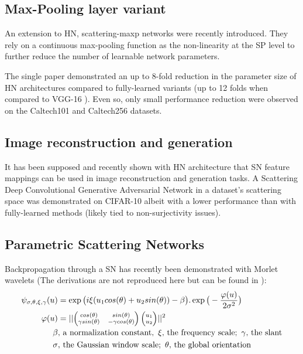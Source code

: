 \documentclass[runningheads]{llncs}
\begin{document}
\subsection{Max-Pooling layer variant}

An extension to HN, scattering-maxp networks were recently introduced\cite{DSN}. They rely on a continuous max-pooling function as the non-linearity at the SP level to further reduce the number of learnable network parameters. 

The single paper\cite{DSN} demonstrated an up to 8-fold reduction in the parameter size of HN architectures compared to fully-learned variants (up to 12 folds when compared to VGG-16 \cite{vgg}). Even so, only small performance reduction were observed on the Caltech101 and Caltech256\cite{caltech256} datasets.

\subsection{Image reconstruction and generation}

It has been supposed\cite{brunathesis}\cite{brunasynthesis}\cite{brunainverse} and recently shown with HN architecture\cite{oyallon} that SN feature mappings can be used in image reconstruction and generation tasks. A Scattering Deep Convolutional Generative Adversarial Network in a dataset's scattering space was demonstrated on CIFAR-10 albeit with a lower performance than with fully-learned methods (likely tied to non-surjectivity issues\cite{oyallon}).

\subsection{Parametric Scattering Networks}

Backpropagation through a SN has recently been demonstrated with Morlet wavelets (The derivations are not reproduced here but can be found in \cite{parametric}):
\begin{align}
\psi_{\sigma, \theta, \xi, \gamma}(u) &= \exp\big(i\xi(u_1cos(\theta) + u_2sin(\theta))-\beta\big).\exp\big(-\frac{\varphi(u)}{2\sigma^2}\big) \\
\varphi(u) &= ||\scriptsize{\begin{pmatrix} cos(\theta) & sin(\theta) \\ \gamma sin(\theta) & -\gamma cos(\theta) \end{pmatrix}\begin{pmatrix} u_1 \\ u_2 \end{pmatrix}}||^2\\
\beta&,\,\text{a normalization constant},\,\,\xi,\,\text{the frequency scale};\,\,\gamma,\,\text{the slant}\notag\\
\sigma&,\,\text{the Gaussian window scale};\,\,\theta,\,\text{the global orientation}\notag
\end{align}
\end{document}
